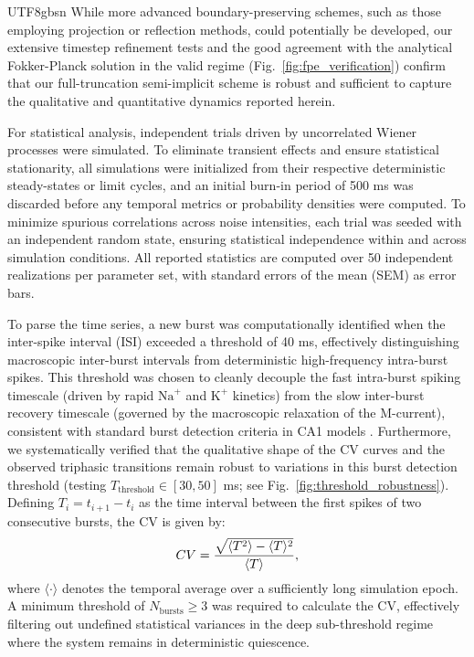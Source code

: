 ﻿\documentclass[reprint, amsmath, amssymb, aps, pre]{revtex4-2}
\begin{document}
\begin{CJK*}{UTF8}{gbsn}
While more advanced boundary-preserving schemes, such as those employing projection or reflection methods, could potentially be developed, our extensive timestep refinement tests and the good agreement with the analytical Fokker-Planck solution in the valid regime (Fig.~\ref{fig:fpe_verification}) confirm that our full-truncation semi-implicit scheme is robust and sufficient to capture the qualitative and quantitative dynamics reported herein.

For statistical analysis, independent trials driven by uncorrelated Wiener processes were simulated. To eliminate transient effects and ensure statistical stationarity, all simulations were initialized from their respective deterministic steady-states or limit cycles, and an initial burn-in period of 500 ms was discarded before any temporal metrics or probability densities were computed. To minimize spurious correlations across noise intensities, each trial was seeded with an independent random state, ensuring statistical independence within and across simulation conditions. All reported statistics are computed over 50 independent realizations per parameter set, with standard errors of the mean (SEM) as error bars.

To parse the time series, a new burst was computationally identified when the inter-spike interval (ISI) exceeded a threshold of 40 ms, effectively distinguishing macroscopic inter-burst intervals from deterministic high-frequency intra-burst spikes. This threshold was chosen to cleanly decouple the fast intra-burst spiking timescale (driven by rapid $\text{Na}^+$ and $\text{K}^+$ kinetics) from the slow inter-burst recovery timescale (governed by the macroscopic relaxation of the M-current), consistent with standard burst detection criteria in CA1 models \cite{golomb2006contribution}. Furthermore, we systematically verified that the qualitative shape of the CV curves and the observed triphasic transitions remain robust to variations in this burst detection threshold (testing $T_{\mathrm{threshold}} \in[30, 50]$ ms; see Fig.~\ref{fig:threshold_robustness}). Defining $T_i = t_{i+1} - t_i$ as the time interval between the first spikes of two consecutive bursts, the CV is given by:
\begin{equation}
CV = \frac{\sqrt{\vphantom{\langle T \rangle} \langle T^2 \rangle - \langle T \rangle^2}}{\langle T \rangle},
\end{equation}
where $\langle \cdot \rangle$ denotes the temporal average over a sufficiently long simulation epoch. A minimum threshold of $N_{\mathrm{bursts}} \ge 3$ was required to calculate the CV, effectively filtering out undefined statistical variances in the deep sub-threshold regime where the system remains in deterministic quiescence.


\end{CJK*}
\end{document}
